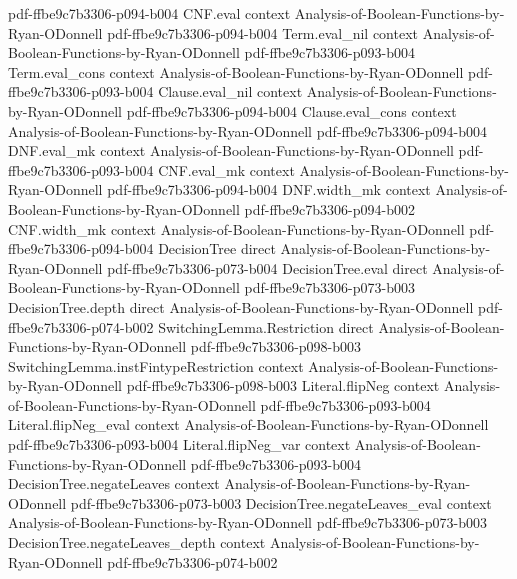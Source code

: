 \begin{theorem}
  {pdf-ffbe9c7b3306-p094-b004}
\proofstep
  {CNF.eval}
  {context}
  {Analysis-of-Boolean-Functions-by-Ryan-ODonnell}
  {pdf-ffbe9c7b3306-p094-b004}
\proofstep
  {Term.eval_nil}
  {context}
  {Analysis-of-Boolean-Functions-by-Ryan-ODonnell}
  {pdf-ffbe9c7b3306-p093-b004}
\proofstep
  {Term.eval_cons}
  {context}
  {Analysis-of-Boolean-Functions-by-Ryan-ODonnell}
  {pdf-ffbe9c7b3306-p093-b004}
\proofstep
  {Clause.eval_nil}
  {context}
  {Analysis-of-Boolean-Functions-by-Ryan-ODonnell}
  {pdf-ffbe9c7b3306-p094-b004}
\proofstep
  {Clause.eval_cons}
  {context}
  {Analysis-of-Boolean-Functions-by-Ryan-ODonnell}
  {pdf-ffbe9c7b3306-p094-b004}
\proofstep
  {DNF.eval_mk}
  {context}
  {Analysis-of-Boolean-Functions-by-Ryan-ODonnell}
  {pdf-ffbe9c7b3306-p093-b004}
\proofstep
  {CNF.eval_mk}
  {context}
  {Analysis-of-Boolean-Functions-by-Ryan-ODonnell}
  {pdf-ffbe9c7b3306-p094-b004}
\proofstep
  {DNF.width_mk}
  {context}
  {Analysis-of-Boolean-Functions-by-Ryan-ODonnell}
  {pdf-ffbe9c7b3306-p094-b002}
\proofstep
  {CNF.width_mk}
  {context}
  {Analysis-of-Boolean-Functions-by-Ryan-ODonnell}
  {pdf-ffbe9c7b3306-p094-b004}
\proofstep
  {DecisionTree}
  {direct}
  {Analysis-of-Boolean-Functions-by-Ryan-ODonnell}
  {pdf-ffbe9c7b3306-p073-b004}
\proofstep
  {DecisionTree.eval}
  {direct}
  {Analysis-of-Boolean-Functions-by-Ryan-ODonnell}
  {pdf-ffbe9c7b3306-p073-b003}
\proofstep
  {DecisionTree.depth}
  {direct}
  {Analysis-of-Boolean-Functions-by-Ryan-ODonnell}
  {pdf-ffbe9c7b3306-p074-b002}
\proofstep
  {SwitchingLemma.Restriction}
  {direct}
  {Analysis-of-Boolean-Functions-by-Ryan-ODonnell}
  {pdf-ffbe9c7b3306-p098-b003}
\proofstep
  {SwitchingLemma.instFintypeRestriction}
  {context}
  {Analysis-of-Boolean-Functions-by-Ryan-ODonnell}
  {pdf-ffbe9c7b3306-p098-b003}
\proofstep
  {Literal.flipNeg}
  {context}
  {Analysis-of-Boolean-Functions-by-Ryan-ODonnell}
  {pdf-ffbe9c7b3306-p093-b004}
\proofstep
  {Literal.flipNeg_eval}
  {context}
  {Analysis-of-Boolean-Functions-by-Ryan-ODonnell}
  {pdf-ffbe9c7b3306-p093-b004}
\proofstep
  {Literal.flipNeg_var}
  {context}
  {Analysis-of-Boolean-Functions-by-Ryan-ODonnell}
  {pdf-ffbe9c7b3306-p093-b004}
\proofstep
  {DecisionTree.negateLeaves}
  {context}
  {Analysis-of-Boolean-Functions-by-Ryan-ODonnell}
  {pdf-ffbe9c7b3306-p073-b003}
\proofstep
  {DecisionTree.negateLeaves_eval}
  {context}
  {Analysis-of-Boolean-Functions-by-Ryan-ODonnell}
  {pdf-ffbe9c7b3306-p073-b003}
\proofstep
  {DecisionTree.negateLeaves_depth}
  {context}
  {Analysis-of-Boolean-Functions-by-Ryan-ODonnell}
  {pdf-ffbe9c7b3306-p074-b002}
\proofstep

\end{theorem}
